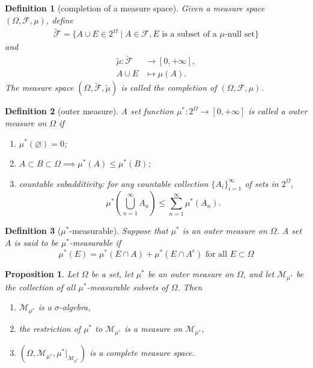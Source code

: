 \documentclass{report}
\newtheorem{definition}{Definition}[section]
\newtheorem{proposition}{Proposition}[section]
\theoremstyle{nonumberplain}
\begin{document}
\begin{definition}[completion of a measure space]
	Given a measure space $(\Omega, \mathcal{F}, \mu)$, define
	\begin{align*}
		\widetilde{\mathcal{F}}=\{A\cup E\in 2^\Omega\mid A\in\mathcal{F},E\text{ is a subset of a $\mu$-null set} \}
	\end{align*}
	and
	\begin{align*}
		\widetilde{\mu}:\widetilde{\mathcal{F}}&\longrightarrow[0,+\infty],\\
		A\cup E&\longmapsto \mu(A).
	\end{align*}
The measure space $(\Omega, \widetilde{\mathcal{F}}, \widetilde{\mu})$ is called the \emph{completion of $(\Omega, \mathcal{F}, \mu)$}.
\end{definition}

\begin{definition}[outer measure]
	A set function $\mu^*:2^\Omega\to[0,+\infty]$  is called a \emph{outer measure} on $\Omega$ if
	\begin{enumerate}[(1)]
		\item $\mu^*(\varnothing) = 0$;
		\item $A\subset B\subset\Omega\implies\mu^*(A) \le\mu^*(B)$;
		\item countable subadditivity: for any countable collection $\{A_{i}\}_{i=1}^{\infty }$ of sets in $2^\Omega$,
		\[
		\mu^*\left(\bigcup_{n=1}^\infty A_n\right)\le\sum_{n=1}^{\infty}\mu^*(A_n).
		\]
	\end{enumerate}
\end{definition}

\begin{definition}[$\mu^{*}$-measurable]
	Suppose that $\mu^*$ is an outer measure on $\Omega$. A set $A$ is said to be \emph{$\mu^{*}$-measurable} if
	\[
	\mu^{*}(E)=\mu^{*}(E \cap A)+\mu^{*}\left(E \cap A^{c}\right) \text { for all } E \subset \Omega
	\]
\end{definition}

\begin{proposition}
	Let $\Omega$ be a set, let $\mu^{*}$ be an outer measure on $\Omega$, and let $\mathcal{M}_{\mu^{*}}$ be the collection of all $\mu^{*}$-measurable subsets of $\Omega$. Then
	\begin{enumerate}[(1)]
		\item $\mathcal{M}_{\mu^{*}}$ is a $\sigma$-algebra,
		\item the restriction of $\mu^{*}$ to $\mathcal{M}_{\mu^{*}}$ is a measure on $\mathcal{M}_{\mu^{*}}$,
		\item $(\Omega, \mathcal{M}_{\mu^{*}}, \mu^{*}|_{\mathcal{M}_{\mu^{*}}})$ is a complete measure space.
	\end{enumerate}
\end{proposition}
\end{document}
